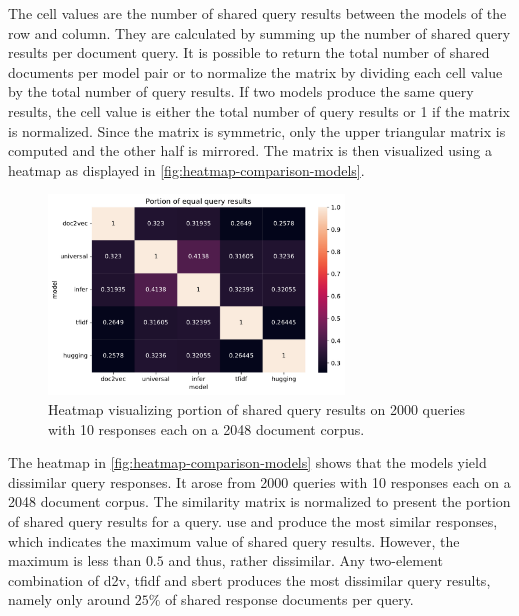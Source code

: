 The cell values are the number of shared query results between the models of the row and column.
They are calculated by summing up the number of shared query results per document query.
It is possible to return the total number of shared documents per model pair
or to normalize the matrix by dividing each cell value by the total number of query results.
If two models produce the same query results, the cell value is either the total number of query results or 1 if the matrix is normalized.
Since the matrix is symmetric, only the upper triangular matrix is computed and the other half is mirrored.
The matrix is then visualized using a heatmap as displayed in \autoref{fig:heatmap-comparison-models}.

\begin{figure}[!htb] %
    \centering
    \includegraphics[width=0.7\textwidth]{images/comparison/Portion_of_equal_query_results.pdf}
    \caption[Comparison of models using a heatmap]
    {Heatmap visualizing portion of shared query results on 2000 queries with 10 responses each on a 2048 document corpus.}
    \label{fig:heatmap-comparison-models}
\end{figure}

The heatmap in \autoref{fig:heatmap-comparison-models} shows that the models yield dissimilar query responses.
It arose from 2000 queries with 10 responses each on a 2048 document corpus.
The similarity matrix is normalized to present the portion of shared query results for a query.
\ac{use} and \infersent{} produce the most similar responses, which indicates the maximum value of shared query results.
However, the maximum is less than $0.5$ and thus, rather dissimilar.
Any two-element combination of \ac{d2v}, \ac{tfidf} and \ac{sbert} produces the most dissimilar query results, 
namely only around $25\%$ of shared response documents per query.


